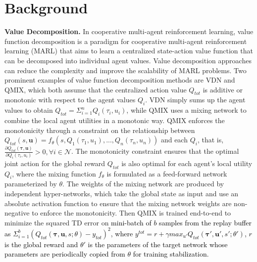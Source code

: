 
\section{Background}

 \textbf{Value Decomposition.} In cooperative multi-agent reinforcement learning, value function decomposition is a paradigm for cooperative multi-agent reinforcement learning (MARL) that aims to learn a centralized state-action value function that can be decomposed into individual agent values. Value decomposition approaches can reduce the complexity and improve the scalability of MARL problems. Two prominent examples of value function decomposition methods are VDN and QMIX, which both assume that the centralized action value $Q_{tot}$ is additive or monotonic with respect to the agent values $Q_i$. VDN simply sums up the agent values to obtain $Q_{tot} = \Sigma_{i=1}^nQ_i(\tau_i, u_i)$, while QMIX uses a mixing network to combine the local agent utilities in a monotonic way. QMIX enforces the monotonicity through a constraint on the relationship between $Q_{tot}(s, \boldsymbol{u}) = f_\theta(s, Q_1(\tau_1, u_1), ..., Q_n(\tau_n, u_n))$ and each $Q_i$, that is, $\frac{\partial{Q_{tot}}(\boldsymbol{\tau}, \boldsymbol{u})}{\partial{Q_i}(\tau_i, u_i)} > 0, \forall i \in \mathcal{N}$. The monotonicity constraint ensures that the optimal joint action for the global reward $Q_{tot}$ is also optimal for each agent’s local utility $Q_i$, where the mixing function $f_\theta$ is formulated as a feed-forward network parameterized by $\theta$. The weights of the mixing network are produced by independent hyper-networks, which take the global state as input and use an absolute activation function to ensure that the mixing network weights are non-negative to enforce the monotonicity. Then QMIX is trained end-to-end to minimize the squared TD error on \textcolor{black}{ mini-batch of $b$ samples from the replay buffer as $\Sigma^b_{i=1}\left(Q_{tot}(\boldsymbol{\tau}, \boldsymbol{u}, s; \theta) - y_{tot} \right)^2$, where $y^{tot} = r + \gamma max_{u'} Q_{tot}(\boldsymbol{\tau'}, \boldsymbol{u'}, s'; \theta')$, $r$ is the global reward and $\theta'$ is the parameters of the target network whose parameters are periodically copied from $\theta$ for training stabilization.}

